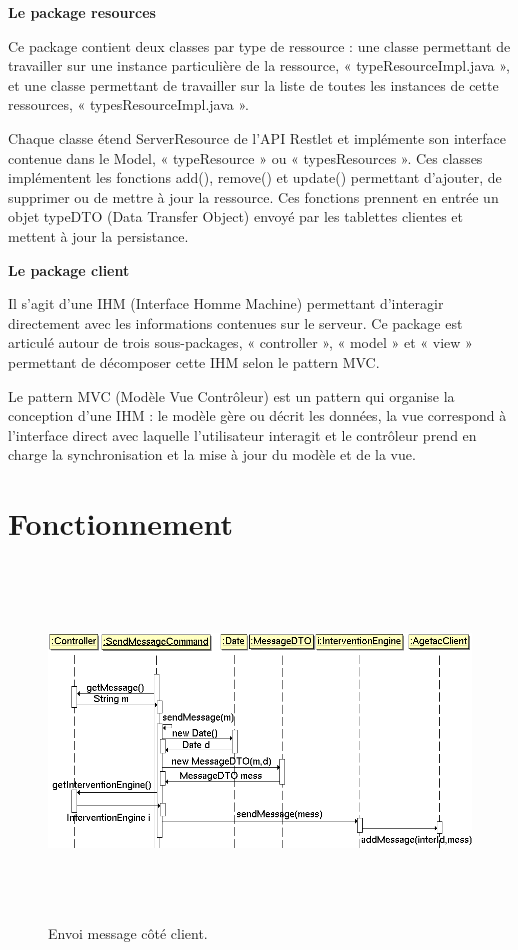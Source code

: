 \documentclass{article}
\begin{document}
\vspace{13pt}
{ \textbf{Le package resources}}

{ Ce package contient deux classes par type de ressource : une classe 
permettant de travailler sur une instance particulière de la ressource, « typeResourceImpl.java 
», et une classe permettant de travailler sur la liste de toutes les instances 
de cette ressources, « typesResourceImpl.java ».}

Chaque classe étend ServerResource de l'API Restlet et implémente 
son interface contenue dans le Model, « typeResource » ou « typesResources ». 
Ces classes implémentent les fonctions add(), remove() et update() permettant 
d'ajouter, de supprimer ou de mettre à jour la ressource. Ces fonctions prennent 
en entrée un objet typeDTO (Data Transfer Object) envoyé par les tablettes clientes 
et mettent à jour la persistance.

\vspace{13pt}
{ \textbf{Le package client}}

Il s'agit d'une IHM (Interface Homme Machine) permettant d'interagir 
directement avec les informations contenues sur le serveur. Ce package est articulé 
autour de trois sous-packages, « controller », « model » et « view » permettant 
de décomposer cette IHM selon le pattern MVC.

Le pattern MVC (Modèle Vue Contrôleur) est un pattern qui organise 
la conception d'une IHM : le modèle gère ou décrit les données, la vue correspond 
à l'interface direct avec laquelle l'utilisateur interagit et le contrôleur prend 
en charge la synchronisation et la mise à jour du modèle et de la vue.


\section{Fonctionnement}


\begin{figure}[htbp]
\begin{center}
\includegraphics[width=531pt, height=268pt]{doc_dev-fig012.png}
\caption{Envoi message côté client.}
\end{center}
\end{figure}
\end{document}
